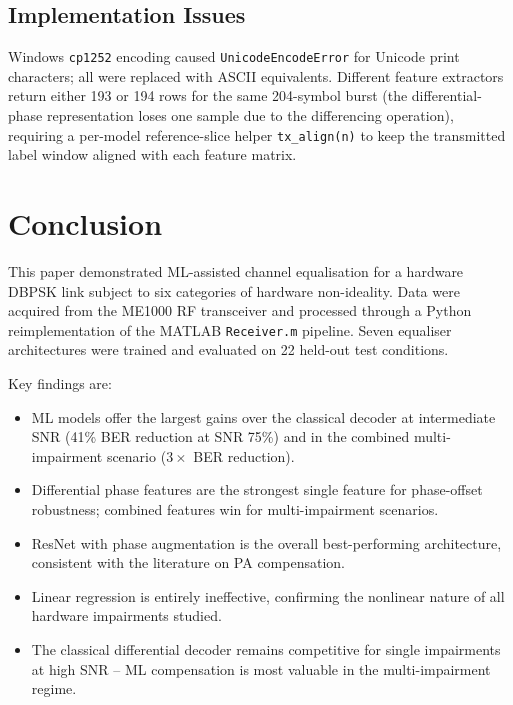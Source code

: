 \documentclass[journal]{IEEEtran}
\begin{document}
\subsection{Implementation Issues}

Windows \texttt{cp1252} encoding caused \texttt{UnicodeEncodeError} for Unicode
print characters; all were replaced with ASCII equivalents.  Different feature
extractors return either 193 or 194 rows for the same 204-symbol burst (the
differential-phase representation loses one sample due to the differencing
operation), requiring a per-model reference-slice helper \texttt{tx\_align(n)}
to keep the transmitted label window aligned with each feature matrix.

\section{Conclusion}
\label{sec:conclusion}

This paper demonstrated ML-assisted channel equalisation for a hardware DBPSK link
subject to six categories of hardware non-ideality. Data were acquired from the
ME1000 RF transceiver and processed through a Python reimplementation of the
MATLAB \texttt{Receiver.m} pipeline. Seven equaliser architectures were trained and
evaluated on 22 held-out test conditions.

Key findings are:
\begin{itemize}
  \item ML models offer the largest gains over the classical decoder at intermediate
        SNR (41\% BER reduction at SNR 75\%) and in the combined multi-impairment
        scenario ($3\times$ BER reduction).
  \item Differential phase features are the strongest single feature for phase-offset
        robustness; combined features win for multi-impairment scenarios.
  \item ResNet with phase augmentation is the overall best-performing architecture,
        consistent with the literature on PA compensation.
  \item Linear regression is entirely ineffective, confirming the nonlinear nature
        of all hardware impairments studied.
  \item The classical differential decoder remains competitive for single impairments
        at high SNR -- ML compensation is most valuable in the multi-impairment regime.
\end{itemize}
\end{document}
